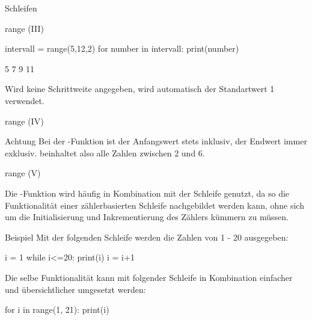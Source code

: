\begin{subsection}{Schleifen}
\begin{frame}[fragile]{range (III)}
\begin{pythoncode}
intervall = range(5,12,2)
for number in intervall:
    print(number)

5
7
9
11
\end{pythoncode}        

            Wird keine Schrittweite angegeben, wird automatisch der Standartwert 1 verwendet.
             
        \end{frame}
        
        \begin{frame}{range (IV)}
        
           \begin{alertblock}{Achtung}
                Bei der -Funktion ist der Anfangswert stets inklusiv, der Endwert immer exklusiv.  beinhaltet also alle Zahlen zwischen 2 und 6.
            \end{alertblock}  
        \end{frame}
        
        \begin{frame}[fragile]{range (V)}
        
            Die -Funktion wird häufig in Kombination mit der  Schleife genutzt, da so die Funktionalität einer zählerbasierten  Schleife nachgebildet werden kann, ohne sich um die Initialisierung und Inkrementierung des Zählers kümmern zu müssen.
            
            \begin{exampleblock}{Beispiel}
                Mit der folgenden  Schleife werden die Zahlen von 1 - 20 ausgegeben:
                
\begin{pythoncode}
i = 1
while i<=20:
    print(i)
    i = i+1
\end{pythoncode}
                Die selbe Funktionalität kann mit folgender  Schleife in Kombination einfacher und übersichtlicher umgesetzt werden:

\begin{pythoncode}
for i in range(1, 21):
    print(i)
\end{pythoncode}               
                
            \end{exampleblock}
        \end{frame}

            
        

\end{subsection}
